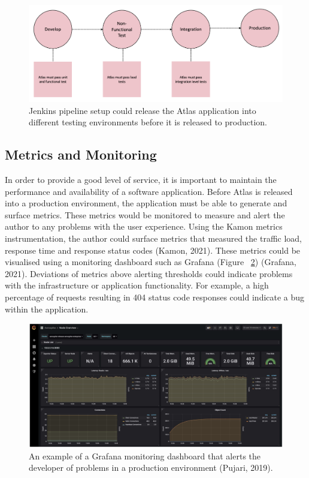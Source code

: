 \documentclass{article}
\begin{document}
\begin{figure}[!htb]
  \centering
      \includegraphics[width=1\textwidth]{images/jenkins.png}
  \caption{Jenkins pipeline setup could release the Atlas application into different testing environments before it is released to production.}
    \label{fig:jenkins}
\end{figure}

\subsection{Metrics and Monitoring}

In order to provide a good level of service, it is important to maintain the performance and availability of a software application. Before Atlas is released into a production environment, the application must be able to generate and surface metrics. These metrics would be monitored to measure and alert the author to any problems with the user experience. Using the Kamon metrics instrumentation, the author could surface metrics that measured the traffic load, response time and response status codes (Kamon, 2021). These metrics could be visualised using a monitoring dashboard such as Grafana (Figure ~\ref{fig:grafana}) (Grafana, 2021). Deviations of metrics above alerting thresholds could indicate problems with the infrastructure or application functionality. For example, a high percentage of requests resulting in 404 status code responses could indicate a bug within the application. 

\begin{figure}[!htb]
  \centering
      \includegraphics[width=1\textwidth]{images/grafana.png}
  \caption{An example of a Grafana monitoring dashboard that alerts the developer of problems in a production environment (Pujari, 2019).}
  \label{fig:grafana}
\end{figure}
\end{document}
